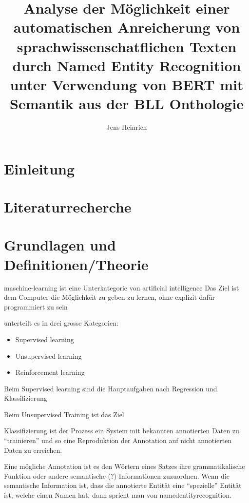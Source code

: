 \documentclass[
german,
]{bachelor}
\author{Jens Heinrich}
\title{%
Analyse der Möglichkeit
einer automatischen Anreicherung von sprachwissenschatflichen Texten
durch Named Entity Recognition
unter Verwendung von BERT
mit Semantik aus der BLL Onthologie%
}
\begin{document}
\maketitle

\tableofcontents
\cleardoublepage

\section{Einleitung}

\section{Literaturrecherche}

\section{Grundlagen und Definitionen/Theorie}

\gls{maschine-learning} ist eine Unterkategorie von artificial intelligence %
Das Ziel ist dem Computer die Möglichkeit zu geben zu lernen, ohne explizit dafür programmiert zu sein \autocite{levity:howdomachineslearn} %

\citeauthor{levity:howdomachineslearn} unterteilt es in drei grosse Kategorien: 
\begin{itemize}
	\item Supervised learning %
	\item Unsupervised learning %
	\item Reinforcement learning %
\end{itemize}

Beim Supervised learning %
sind die Hauptaufgaben nach \autocite{levity:howdomachineslearn} Regression %
und Klassifizierung %

Beim Unsupervised Training ist das Ziel

Klassifizierung %
ist der Prozess ein System mit bekannten annotierten Daten zu \enquote{trainieren} 
und so eine Reproduktion der Annotation auf nicht annotierten Daten zu erreichen.

Eine mögliche Annotation ist es den Wörtern eines Satzes ihre grammatikalische Funktion
oder andere semantische (?) Informationen %
zuzuordnen.
Wenn die semantische Information ist,
dass die annotierte Entität eine \enquote{spezielle} Entität ist, 
welche einen Namen hat,
dann spricht man von \gls{namedentityrecognition}.
\end{document}
